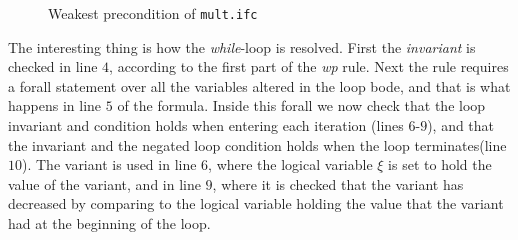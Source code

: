 \begin{figure}[h]

\caption{Weakest precondition of \texttt{mult.ifc}}
\label{figure:wpmult}
\end{figure}

The interesting thing is how the \textit{while}-loop is resolved. First the \textit{invariant} is checked in line $4$, according to the first part of the \textit{wp} rule. 
Next the rule requires a forall statement over all the variables altered in the loop bode, and that is what happens in line $5$ of the formula.
Inside this forall we now check that the loop invariant and condition holds when entering each iteration (lines $6$-$9$), and that the invariant and the negated loop condition holds when the loop terminates(line $10$).
The variant is used in line $6$, where the logical variable $\xi$ is set to hold the value of the variant, and in line $9$, where it is checked that the variant has decreased by comparing to the logical variable holding the value that the variant had at the beginning of the loop.




